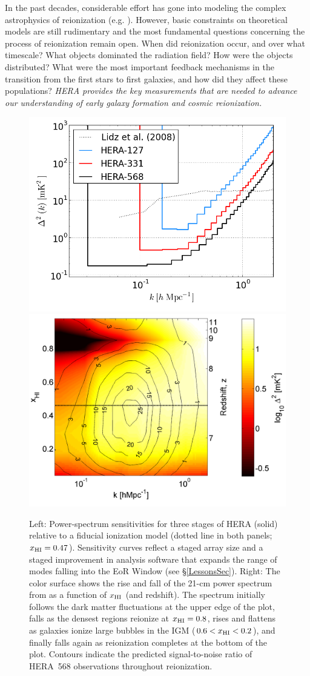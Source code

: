 \documentclass[preprint]{aastex}
\def\HI{{H{\small I }}}
\def\xHI{{x_{\rm\HI}}}
\begin{document}
In the past decades, considerable effort has gone into modeling the complex astrophysics
of reionization 
(e.g. \citealt{shapiro_giroux1987,haiman_loeb1997,furlanetto_et_al2004,santos_et_al2010}).  However,
basic constraints on theoretical models are still rudimentary and the most
fundamental questions concerning the process of reionization remain open.
When did
reionization occur, and over what timescale?  What objects dominated the
radiation field? How were the objects distributed? 
What were the most important feedback mechanisms in the transition 
from the first stars to first galaxies, and how did they affect these populations?
{\it HERA provides the key measurements 
that are needed to 
advance our understanding of early galaxy formation and
cosmic reionization.}

\begin{figure}[t]\centering
\includegraphics[height=2.40 in]{plots/eor_pspec.png}
\includegraphics[height=2.45 in]{plots/hera_snr_contour.png} 
\caption{\small 
Left: Power-spectrum sensitivities for three stages of
HERA (solid) relative to a fiducial ionization model (dotted line in both panels; $\xHI=0.47$).  
Sensitivity curves reflect a staged array size and
a staged improvement in analysis software that expands the range
of modes falling into the EoR Window (see \S\ref{LessonsSec}).
Right: The color surface shows the rise and fall of the 21-cm power spectrum from 
\citealt{lidz_et_al2008} as a function of $\xHI$ (and redshift).
The spectrum initially follows the dark matter fluctuations at the upper edge
of the plot, falls as the densest regions reionize at $\xHI=0.8$, rises and flattens as galaxies ionize large bubbles in the IGM
($0.6<\xHI<0.2$), and finally
falls again as reionization completes at the bottom of the
plot. Contours indicate the predicted signal-to-noise ratio of HERA~568 observations
throughout reionization.
}\label{fig:eor_pspec} 
\end{figure}
\end{document}
